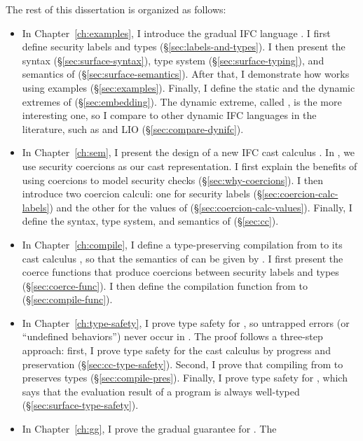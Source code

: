 \clearpage

The rest of this dissertation is organized as follows:

\begin{itemize}
  \item In Chapter~\ref{ch:examples}, I introduce the gradual IFC language
    \Surface. I first define security labels and types
    (\S\ref{sec:labels-and-types}). I then present the syntax
    (\S\ref{sec:surface-syntax}), type system (\S\ref{sec:surface-typing}),
    and semantics of \Surface (\S\ref{sec:surface-semantics}). After that, I
    demonstrate how \Surface works using examples (\S\ref{sec:examples}).
    Finally, I define the static and the dynamic extremes of \Surface
    (\S\ref{sec:embedding}). The dynamic extreme, called \DynIFC, is the more
    interesting one, so I compare \DynIFC to other dynamic IFC languages in the
    literature, such as \laminfo and LIO (\S\ref{sec:compare-dynifc}).
  \item In Chapter~\ref{ch:sem}, I present the design of a new IFC cast calculus
    \CC. In \CC, we use security coercions as our cast representation. I first
    explain the benefits of using coercions to model security checks
    (\S\ref{sec:why-coercions}). I then introduce two coercion calculi: one for
    security labels (\S\ref{sec:coercion-calc-labels}) and the other for the
    values of \CC (\S\ref{sec:coercion-calc-values}). Finally, I define the
    syntax, type system, and semantics of \CC (\S\ref{sec:cc}).
  \item In Chapter~\ref{ch:compile}, I define a type-preserving compilation from
    \Surface to its cast calculus \CC, so that the semantics of \Surface can be
    given by \CC. I first present the coerce functions that produce coercions
    between security labels and types (\S\ref{sec:coerce-func}). I then
    define the compilation function from \Surface to \CC
    (\S\ref{sec:compile-func}).
  \item In Chapter~\ref{ch:type-safety}, I prove type safety for \Surface, so
    untrapped errors (or ``undefined behaviors'') never occur in \Surface. The
    proof follows a three-step approach: first, I prove type safety for the cast
    calculus \CC by progress and preservation (\S\ref{sec:cc-type-safety}).
    Second, I prove that compiling from \Surface to \CC preserves types
    (\S\ref{sec:compile-pres}). Finally, I prove type safety for \Surface, which
    says that the evaluation result of a \Surface program is always well-typed
    (\S\ref{sec:surface-type-safety}).
  \item In Chapter~\ref{ch:gg}, I prove the gradual guarantee for \Surface. The

\end{itemize}
